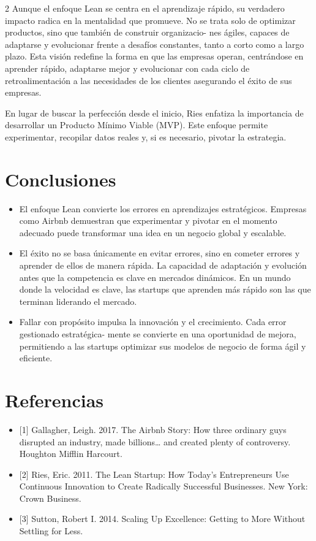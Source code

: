 \documentclass[12pt,spanish,Letterpaper,openany]{book}
\providecommand{\tightlist}{%
  \setlength{\itemsep}{0pt}\setlength{\parskip}{0pt}}
\begin{document}
\begin {multicols}{2}
Aunque el enfoque Lean se centra en el aprendizaje rápido, su verdadero impacto radica en la mentalidad que promueve. No se trata solo de optimizar productos, sino que también de construir organizacio-
nes ágiles, capaces de adaptarse y evolucionar frente a desafíos
constantes, tanto a corto como a largo plazo. Esta visión redefine la forma en que las empresas operan, centrándose en aprender rápido, adaptarse mejor y evolucionar con cada ciclo de retroalimentación a las necesidades de los clientes asegurando el éxito de sus
empresas.

En lugar de buscar la perfección desde el inicio, Ries enfatiza la importancia de desarrollar un Producto Mínimo Viable (MVP). Este enfoque permite experimentar, recopilar datos reales y, si es necesario, pivotar la estrategia.

\hypertarget{conclusiones-1}{%
\section{Conclusiones}\label{conclusiones-1}}

\begin{itemize}
\tightlist
\item
  El enfoque Lean convierte los errores en aprendizajes estratégicos. Empresas como Airbnb demuestran que experimentar y pivotar en el momento adecuado puede transformar una idea en un negocio global y escalable.
\item
  El éxito no se basa únicamente en evitar errores, sino en cometer errores y aprender de ellos de manera rápida. La capacidad de adaptación y evolución antes que la competencia es clave en mercados dinámicos. En un mundo donde la velocidad es clave, las startups que aprenden más rápido son las que terminan liderando el mercado.
\item
  Fallar con propósito impulsa la innovación y el crecimiento. Cada error gestionado estratégica-
  mente se convierte en una oportunidad de mejora, permitiendo a las startups optimizar sus modelos de negocio de forma ágil y eficiente.
\end{itemize}

\hypertarget{referencias-1}{%
\section{Referencias}\label{referencias-1}}

\begin{itemize}
\item
  {[}1{]} Gallagher, Leigh. 2017. The Airbnb Story: How three ordinary guys disrupted an industry, made billions\ldots{} and created plenty of controversy. Houghton Mifflin Harcourt.
\item
  {[}2{]} Ries, Eric. 2011. The Lean Startup: How Today's Entrepreneurs Use Continuous Innovation to Create Radically Successful Businesses. New York: Crown Business.
\item
  {[}3{]} Sutton, Robert I. 2014. Scaling Up Excellence: Getting to More Without Settling for Less.
\end{itemize}

\end {multicols}
\end{document}

